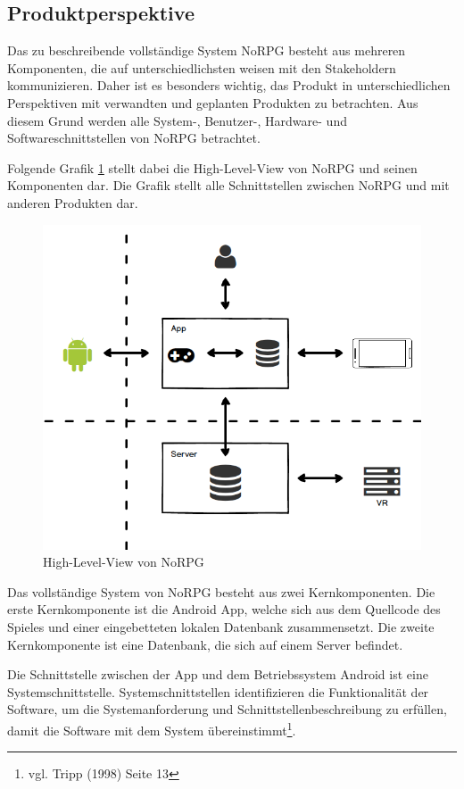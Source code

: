 	\subsection{Produktperspektive}
		Das zu beschreibende vollständige System NoRPG besteht aus mehreren Komponenten, die auf unterschiedlichsten weisen mit den Stakeholdern kommunizieren. Daher ist es besonders wichtig, das Produkt in unterschiedlichen Perspektiven mit verwandten und geplanten Produkten zu betrachten. Aus diesem Grund werden alle System-, Benutzer-, Hardware- und Softwareschnittstellen von NoRPG betrachtet. 
		
		Folgende Grafik \ref{highlevelview} stellt dabei die High-Level-View von NoRPG und seinen Komponenten dar. Die Grafik stellt alle Schnittstellen zwischen NoRPG und mit anderen Produkten dar.

		\begin{figure}[htbp]
			\centering 
			\label{highlevelview}
			\includegraphics[width=12cm]{pics/HighLevelView.png}
			\caption{High-Level-View von NoRPG}
		\end{figure}
		
		Das vollständige System von NoRPG besteht aus zwei Kernkomponenten. Die erste Kernkomponente ist die Android App, welche sich aus dem Quellcode des Spieles und einer eingebetteten lokalen Datenbank zusammensetzt. Die zweite Kernkomponente ist eine Datenbank, die sich auf einem Server befindet.
		
		Die Schnittstelle zwischen der App und dem Betriebssystem Android ist eine Systemschnittstelle. Systemschnittstellen identifizieren die Funktionalität der Software, um die Systemanforderung und Schnittstellenbeschreibung zu erfüllen, damit die Software mit dem System übereinstimmt\footnote{vgl. Tripp \cite{srsIEEE}(1998) Seite 13}.
		
